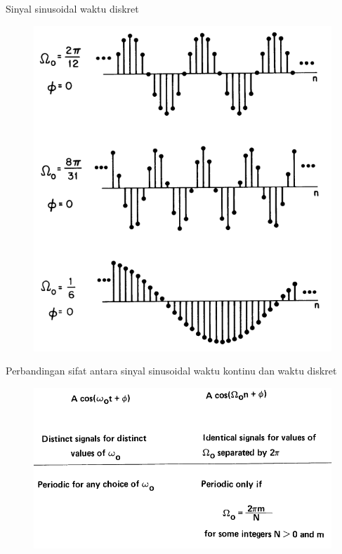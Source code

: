 \documentclass[pdflatex,compress,mathserif]{beamer}
\begin{document}
\begin{frame}{Sinyal sinusoidal waktu diskret}
	\begin{figure}
		\centering
		\includegraphics[height=0.8\textheight]{img/01.slide_11}
	\end{figure}
\end{frame}

\begin{frame}{Perbandingan sifat antara sinyal sinusoidal waktu kontinu dan waktu diskret}
	\begin{figure}
		\centering
		\includegraphics[height=0.7\textheight]{img/01.slide_12}
	\end{figure}
\end{frame}
\end{document}

